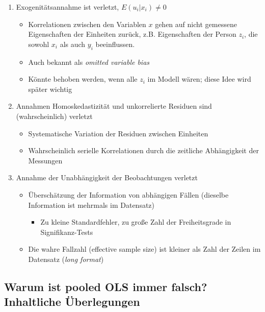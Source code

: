 \documentclass[
]{book}
\providecommand{\tightlist}{%
  \setlength{\itemsep}{0pt}\setlength{\parskip}{0pt}}
\begin{document}
\begin{enumerate}
\def\labelenumi{\arabic{enumi})}
\tightlist
\item
  Exogenitätsannahme ist verletzt, \(E(u_i|x_i) \neq 0\)

  \begin{itemize}
  \tightlist
  \item
    Korrelationen zwischen den Variablen \(x\) gehen auf nicht gemessene Eigenschaften der Einheiten zurück, z.B. Eigenschaften der Person \(z_i\), die sowohl \(x_i\) als auch \(y_i\) beeinflussen.
  \item
    Auch bekannt als \emph{omitted variable bias}
  \item
    Könnte behoben werden, wenn alle \(z_i\) im Modell wären; diese Idee wird später wichtig
  \end{itemize}
\item
  Annahmen Homoskedastizität und unkorrelierte Residuen sind (wahrscheinlich) verletzt

  \begin{itemize}
  \tightlist
  \item
    Systematische Variation der Residuen zwischen Einheiten
  \item
    Wahrscheinlich serielle Korrelationen durch die zeitliche Abhängigkeit der Messungen
  \end{itemize}
\item
  Annahme der Unabhängigkeit der Beobachtungen verletzt

  \begin{itemize}
  \tightlist
  \item
    Überschätzung der Information von abhängigen Fällen (dieselbe Information ist mehrmals im Datensatz)

    \begin{itemize}
    \tightlist
    \item
      Zu kleine Standardfehler, zu große Zahl der Freiheitsgrade in Signifikanz-Tests
    \end{itemize}
  \item
    Die wahre Fallzahl (effective sample size) ist kleiner als Zahl der Zeilen im Datensatz (\emph{long format})
  \end{itemize}
\end{enumerate}

\hypertarget{warum-ist-pooled-ols-immer-falsch-inhaltliche-uxfcberlegungen}{%
\subsection*{Warum ist pooled OLS immer falsch? Inhaltliche Überlegungen}\label{warum-ist-pooled-ols-immer-falsch-inhaltliche-uxfcberlegungen}}
\end{document}
